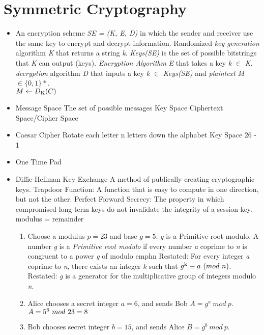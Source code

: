 \documentclass{article}
\begin{document}
\section*{Symmetric Cryptography}
\begin{itemize}
  \item An encryption scheme \emph{SE = (K, E, D)} in which the sender and receiver use the same key to encrypt and decrypt information.
    \subitem Randomized \emph{key generation} algorithm \emph{K} that returns a string \emph{k}. \emph{Keys(SE)}  is the set of possible bitstrings that \emph{K} can output (keys).
    \subitem \emph{Encryption Algorithm}  \emph{E} that takes a key \emph{k} $ \in $ \emph{K}.
    \subitem \emph{decryption} algorithm \emph{D} that inputs a key \emph{k} $ \in $ \emph{Keys(SE)} and
    \emph{plaintext} \emph{M} $ \in  \{0, 1\}* $.\\ 
    $ M \gets D\textsubscript{K}(C) $
  \item Message Space
    \subitem The set of possible messages
    \subitem Key Space
    \subitem Ciphertext Space/Cipher Space
  \item Caesar Cipher
    \subitem Rotate each letter n letters down the alphabet
    \subitem Key Space 26 - 1
  \item One Time Pad
  \item Diffie-Hellman Key Exchange
    \subitem A method of publically creating cryptographic keys.
    \subitem Trapdoor Function: A function that is easy to compute in one direction, but not the other.
    \subitem Perfect Forward Secrecy: The property in which compromised long-term keys do not invalidate the 
    integrity of a session key.
    \subitem modulus = remainder
    \begin{enumerate}
      \item Choose a modulus $p=23$ and base $g=5$. 
        \subitem \emph{g} is a Primitive root modulo. A number \emph{g} is a \emph{Primitive root modulo}
        if every number \emph{a} coprime to \emph{n} is congruent to a power \emph{g} of modulo emph{n}
        \subitem Restated: For every integer \emph{a} coprime to \emph{n}, there exists an integer \emph{k} such that
        $g\textsuperscript{k} \equiv a\ (mod\ n)$.
        \subitem Restated: \emph{g} is a generator for the multiplicative group of integers modulo \emph{n}.
      \item Alice chooses a secret integer $a = 6$, and sends Bob $A = g^{a}\ mod\ p$.
        \subitem $ A = 5\textsuperscript{6}\ mod\ 23 = 8$
      \item Bob chooses secret integer $b = 15$, and sends Alice $B = g^{b}\ mod\ p$.

\end{enumerate}
\end{itemize}
\end{document}
